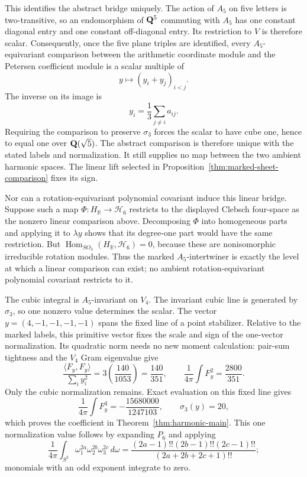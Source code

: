 This identifies the abstract bridge uniquely.  The action of \(A_5\) on
five letters is two-transitive, so an endomorphism of \(\mathbf Q^5\) commuting
with \(A_5\) has one constant diagonal entry and one constant off-diagonal
entry.  Its restriction to \(V\) is therefore scalar.  Consequently, once
the five plane triples are identified, every \(A_5\)-equivariant comparison
between the arithmetic coordinate module and the Petersen coefficient
module is a scalar multiple of
\[
 y\longmapsto (y_i+y_j)_{i<j}.
\]
The inverse on its image is
\[
 y_i=\frac13\sum_{j\ne i}a_{ij}.
\]
Requiring the comparison to preserve \(\sigma_3\) forces the scalar to
have cube one, hence to equal one over \(\mathbf Q(\sqrt5)\).  The abstract
comparison is therefore unique with the stated labels and normalization.  It
still supplies no map between the two ambient harmonic spaces.  The linear
lift selected in Proposition~\ref{thm:marked-sheet-comparison} fixes its sign.

Nor can a rotation-equivariant polynomial covariant induce this linear bridge.
Suppose such a map \(\Phi:H_{\mathbb R}\to\mathcal H_6\)
restricts to the displayed Clebsch four-space as the nonzero linear
comparison above.  Decomposing \(\Phi\) into homogeneous parts and applying
it to \(\lambda y\) shows that its degree-one part would have the same
restriction.  But
\(\operatorname{Hom}_{SO_3}(H_{\mathbb R},\mathcal H_6)=0\), because these
are nonisomorphic irreducible rotation modules.  Thus
the marked \(A_5\)-intertwiner is exactly the level at which a linear
comparison can exist; no ambient rotation-equivariant polynomial covariant
restricts to it.

The cubic integral is \(A_5\)-invariant on \(V_4\).  The invariant cubic
line is generated by \(\sigma_3\), so one nonzero value determines the
scalar.  The vector \(y=(4,-1,-1,-1,-1)\) spans the fixed line of a point
stabilizer.  Relative to the marked labels, this primitive vector fixes the
scale and sign of the one-vector normalization.  Its quadratic norm needs no
new moment calculation: pair-sum tightness and the \(V_4\) Gram eigenvalue give
\[
 \frac{\langle F_y,F_y\rangle}{\sum_i y_i^2}
 =3\left(\frac{140}{1053}\right)=\frac{140}{351},
 \qquad
 \frac1{4\pi}\int F_y^2=\frac{2800}{351}.
\]
Only the cubic normalization remains.  Exact evaluation on this fixed line
gives
\[
 \frac1{4\pi}\int F_y^3=-\frac{15680000}{1247103},
 \qquad \sigma_3(y)=20,
\]
which proves the coefficient in Theorem~\ref{thm:harmonic-main}.  This one
normalization value follows by expanding \(P_6\) and applying
\[
 \frac1{4\pi}\int_{S^2}
 \omega_1^{2a}\omega_2^{2b}\omega_3^{2c}\,d\omega
 =
 \frac{(2a-1)!!(2b-1)!!(2c-1)!!}
 {(2a+2b+2c+1)!!};
\]
monomials with an odd exponent integrate to zero.

